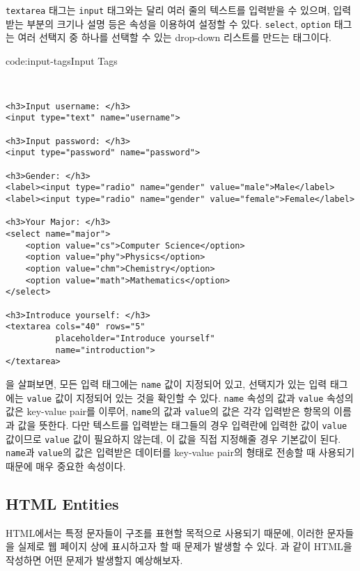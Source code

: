 \texttt{textarea} 태그는 \texttt{input} 태그와는 달리 여러 줄의 텍스트를 입력받을 수 있으며, 입력받는 부분의 크기나 설명 등은 속성을 이용하여 설정할 수 있다. \texttt{select}, \texttt{option} 태그는 여러 선택지 중 하나를 선택할 수 있는 drop-down 리스트를 만드는 태그이다. 

\begin{codeenv}{code:input-tags}{Input Tags}\begin{verbatim}


<h3>Input username: </h3>
<input type="text" name="username">

<h3>Input password: </h3>
<input type="password" name="password">

<h3>Gender: </h3>
<label><input type="radio" name="gender" value="male">Male</label>
<label><input type="radio" name="gender" value="female">Female</label>

<h3>Your Major: </h3>
<select name="major">
    <option value="cs">Computer Science</option>
    <option value="phy">Physics</option>
    <option value="chm">Chemistry</option>
    <option value="math">Mathematics</option>
</select>

<h3>Introduce yourself: </h3>
<textarea cols="40" rows="5"
          placeholder="Introduce yourself"
          name="introduction">
</textarea>
\end{verbatim}
\end{codeenv}

을 살펴보면, 모든 입력 태그에는 \texttt{name} 값이 지정되어 있고, 선택지가 있는 입력 태그에는 \texttt{value} 값이 지정되어 있는 것을 확인할 수 있다. \texttt{name} 속성의 값과 \texttt{value} 속성의 값은 key-value pair를 이루어, \texttt{name}의 값과 \texttt{value}의 값은 각각 입력받은 항목의 이름과 값을 뜻한다. 다만 텍스트를 입력받는 태그들의 경우 입력란에 입력한 값이 \texttt{value} 값이므로 \texttt{value} 값이 필요하지 않는데, 이 값을 직접 지정해줄 경우 기본값이 된다. \texttt{name}과 \texttt{value}의 값은 입력받은 데이터를 key-value pair의 형태로 전송할 때 사용되기 때문에 매우 중요한 속성이다.

\subsection*{HTML Entities}

HTML에서는 특정 문자들이 구조를 표현할 목적으로 사용되기 때문에, 이러한 문자들을 실제로 웹 페이지 상에 표시하고자 할 때 문제가 발생할 수 있다. 과 같이 HTML을 작성하면 어떤 문제가 발생할지 예상해보자. 

